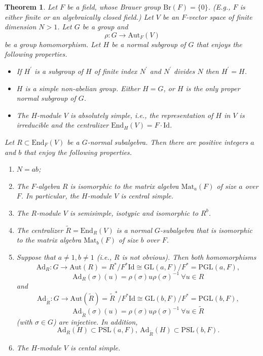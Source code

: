 \documentclass[12pt,a4paper,reqno]{amsart}
\def\End{\mathrm{End}}
\def\Aut{\mathrm{Aut}}
\def\Mat{\mathrm{Mat}}
\def\Id{\mathrm{Id}}
\newtheorem{thm}{Theorem}[section]
\theoremstyle{definition}
\begin{document}
\begin{thm}
\label{AdGH}
Let $F$ be a field, whose Brauer group $\mathrm{Br}(F)=\{0\}$. (E.g., $F$ is either finite or an algebraically closed field.)
Let
$V$ be an $F$-vector space of finite  dimension $N>1$.
Let $G$ be a group and
$$\rho: G \to \Aut_F(V)$$
be a group homomorphism.
Let $H$ be a  normal subgroup of  $G$ that enjoys the following properties.
\begin{itemize}
\item[(i)]
If $H^{\prime}$ is a subgroup of $H$ of finite index $N^{\prime}$ and $N^{\prime}$ divides $N$
then $H^{\prime}=H$.
\item[(ii)]
$H$ is a simple non-abelian group. Either $H=G$,  or $H$  is the only proper normal subgroup of $G$.
\item[(iii)]
The $H$-module $V$ is absolutely simple, i.e., the representation of $H$ in $V$ is irreducible and the centralizer
$\End_H(V)=F \cdot \Id$.
\end{itemize}
Let $R \subset \End_F(V)$ be a $G$-normal subalgebra.   Then there are positive integers $a$ and $b$ that enjoy the following properties.
\begin{enumerate}
\item[(a)]
$N=ab$;
\item[(b)]
The $F$-algebra $R$ is isomorphic to the matrix algebra $\Mat_a(F)$ of size $a$ over $F$.
In particular, the $H$-module $V$ is central simple.
\item
The $R$-module  $V$ is semisimple, isotypic and isomorphic to $R^b$.
\item[(c)]
The centralizer $\tilde{R}=\End_R(V)$ is a normal $G$-subalgebra that is isomorphic to  the matrix algebra $\Mat_b(F)$ of size $b$ over $F$.
\item[(d)]
Suppose that $a \ne 1, b \ne 1$ (i.e., $R$ is not obvious).  Then both homomorphisms
$$ \mathrm{Ad}_R: G \to \Aut(R)=R^{*}/F^{*}\Id\cong \mathrm{GL}(a,F)/F^{*}=\mathrm{PGL}(a,F),$$
$$\mathrm{Ad}_R(\sigma) (u)=\rho(\sigma)u \rho(\sigma)^{-1} \ \forall u \in R$$
and
$$ \mathrm{Ad}_{\tilde{R}}: G \to \Aut(\tilde{R})=\tilde{R}^{*}/F^{*}\Id\cong \mathrm{GL}(b,F)/F^{*}=\mathrm{PGL}(b,F),$$
$$\mathrm{Ad}_{\tilde{R}}(\sigma) (u)=\rho(\sigma)u \rho(\sigma)^{-1} \ \forall u \in \tilde{R}$$
(with $\sigma \in G$) are injective. In addition,
$$ \mathrm{Ad}_R(H)\subset \mathrm{PSL}(a,F), \ \mathrm{Ad}_{\tilde{R}}(H)\subset \mathrm{PSL}(b,F).$$
\item[(e)]
The $H$-module $V$ is cental simple.
\end{enumerate}
\end{thm}
\end{document}
